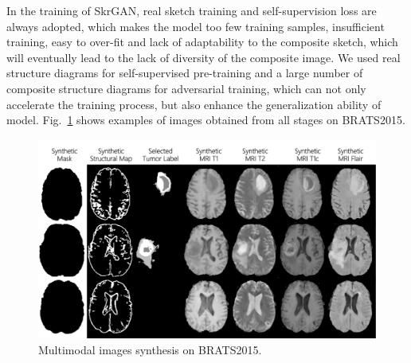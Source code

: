 \documentclass[runningheads]{llncs}
\begin{document}
	In the training of SkrGAN\cite{96zhang2019skrgan:}, real sketch training and self-supervision loss are always adopted, which makes the model too few training samples, insufficient training, easy to over-fit and lack of adaptability to the composite sketch, which will eventually lead to the lack of diversity of the composite image. We used real structure diagrams for self-supervised pre-training and a large number of composite structure diagrams for adversarial training, which can not only accelerate the training process, but also enhance the generalization ability of model. Fig.~\ref{generated_mri} shows examples of images obtained from all stages on BRATS2015.
	\begin{figure}
		\centering
		\includegraphics[width=0.65\linewidth]{figures/F_to_MRI}
		\caption{Multimodal images synthesis on BRATS2015.}
		\label{generated_mri}
	\end{figure}
\end{document}
